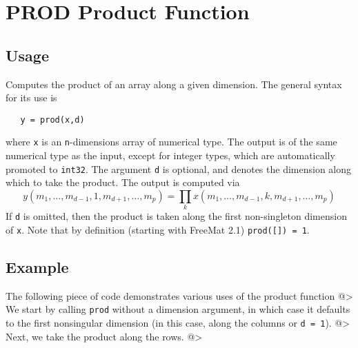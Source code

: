 \section{PROD Product Function}

\subsection{Usage}

Computes the product of an array along a given dimension.  The general
syntax for its use is
\begin{verbatim}
   y = prod(x,d)
\end{verbatim}
where \verb|x| is an \verb|n|-dimensions array of numerical type.
The output is of the same numerical type as the input, except 
for integer types, which are automatically promoted to \verb|int32|.
 The argument \verb|d| is optional, and denotes the dimension along 
which to take the product.  The output is computed via
\[
  y(m_1,\ldots,m_{d-1},1,m_{d+1},\ldots,m_{p}) = 
    \prod_{k} x(m_1,\ldots,m_{d-1},k,m_{d+1},\ldots,m_{p})
\]
If \verb|d| is omitted, then the product is taken along the 
first non-singleton dimension of \verb|x|. Note that by definition
(starting with FreeMat 2.1) \verb|prod([]) = 1|.
\subsection{Example}

The following piece of code demonstrates various uses of the product
function
@>
We start by calling \verb|prod| without a dimension argument, in which case it defaults to the first nonsingular dimension (in this case, along the columns or \verb|d = 1|).
@>
Next, we take the product along the rows.
@>
